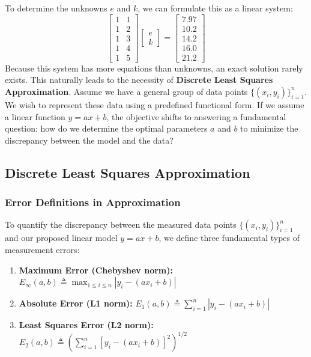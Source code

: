 \documentclass[12pt, a4paper]{article}
\theoremstyle{break}
\begin{document}
To determine the unknowns $e$ and $k$, we can formulate this as a linear system:
\begin{equation*}
    \begin{bmatrix} 1 & 1 \\ 1 & 2 \\ 1 & 3 \\ 1 & 4 \\ 1 & 5 \end{bmatrix} \begin{bmatrix} e \\ k \end{bmatrix} = \begin{bmatrix} 7.97 \\ 10.2 \\ 14.2 \\ 16.0 \\ 21.2 \end{bmatrix}
\end{equation*}
Because this system has more equations than unknowns, an exact solution rarely exists. This naturally leads to the necessity of \textbf{Discrete Least Squares Approximation}.
Assume we have a general group of data points $\{(x_i, y_i)\}_{i=1}^n$.
We wish to represent these data using a predefined functional form.
If we assume a linear function $y = ax + b$, the objective shifts to answering a fundamental question: how do we determine the optimal parameters $a$ and $b$ to minimize the discrepancy between the model and the data?
\subsection{Discrete Least Squares Approximation}

\subsubsection*{Error Definitions in Approximation}
To quantify the discrepancy between the measured data points $\{(x_i, y_i)\}_{i=1}^n$ and our proposed linear model $y = ax + b$, we define three fundamental types of measurement errors:
\begin{enumerate}
    \item \textbf{Maximum Error (Chebyshev norm):} $E_\infty(a,b) \triangleq \max_{1 \le i \le n} |y_i - (ax_i + b)|$
    \item \textbf{Absolute Error (L1 norm):} $E_1(a,b) \triangleq \sum_{i=1}^n |y_i - (ax_i + b)|$
    \item \textbf{Least Squares Error (L2 norm):} $E_2(a,b) \triangleq \left( \sum_{i=1}^n [y_i - (ax_i + b)]^2 \right)^{1/2}$
\end{enumerate}
\end{document}
